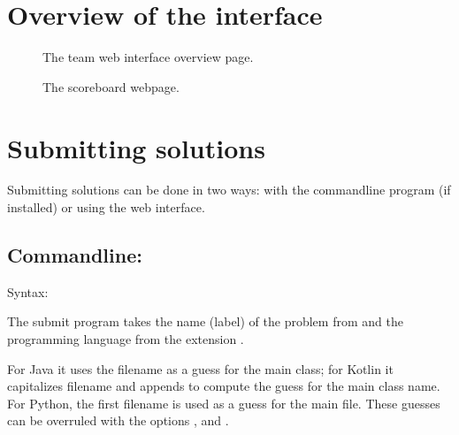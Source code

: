 \documentclass[a4paper,10pt,english,openany]{sphinxmanual}
\begin{document}
\clearpage


\section{Overview of the interface}
\label{\detokenize{team:overview-of-the-interface}}
\begin{figure}[htbp]
\centering
\capstart

\noindent{}
\caption{The team web interface overview page.}\label{\detokenize{team:id3}}\end{figure}

\begin{figure}[htbp]
\centering
\capstart

\noindent{}
\caption{The scoreboard webpage.}\label{\detokenize{team:id4}}\end{figure}




\section{Submitting solutions}
\label{\detokenize{team:submitting-solutions}}\label{\detokenize{team:submitting}}
\sphinxAtStartPar
Submitting solutions can be done in two ways: with the command\sphinxhyphen{}line
program  (if installed) or using the web interface.


\subsection{Command\sphinxhyphen{}line: }
\label{\detokenize{team:command-line-submit}}
\sphinxAtStartPar
Syntax:

\begin{sphinxVerbatim}[commandchars=\\\{\}]
 \PYG{p}{[}\PYG{p}{]}  
\end{sphinxVerbatim}

\sphinxAtStartPar
The submit program takes the name (label) of the problem from
 and the programming language from the extension
.

\sphinxAtStartPar
For Java it uses the filename as a guess for the
main class; for Kotlin it capitalizes filename and appends
 to compute the guess for the main class name. For Python,
the first filename is used as a guess for the main file.
These guesses can be overruled with the options
,  and
.
\end{document}
